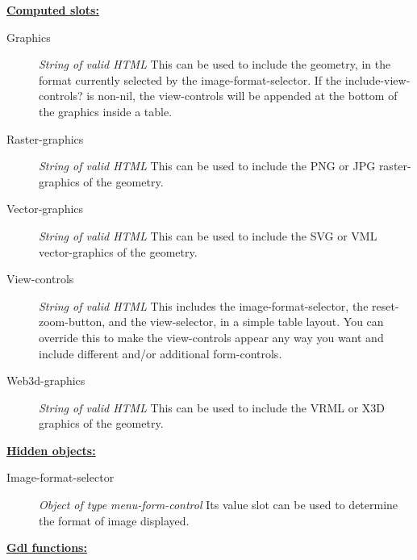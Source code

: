 \documentclass [11pt]{book}
\begin{document}
\begin{itemize}
\textbf{
\underline{Computed slots:}}

\begin{description}

\item [Graphics]
\emph{String of valid HTML} This can be used to
include the geometry, in the format currently selected by the image-format-selector.
If the include-view-controls? is non-nil, the view-controls will be appended at the
bottom of the graphics inside a table.


\item [Raster-graphics]
\emph{String of valid HTML} This can be used to
include the PNG or JPG raster-graphics of the geometry.


\item [Vector-graphics]
\emph{String of valid HTML} This can be used to
include the SVG or VML vector-graphics of the geometry.


\item [View-controls]
\emph{String of valid HTML} This includes the image-format-selector, the reset-zoom-button,
and the view-selector, in a simple table layout. You can override this to make the view-controls
appear any way you want and include different and/or additional form-controls.


\item [Web3d-graphics]
\emph{String of valid HTML} This can be used to
include the VRML or X3D graphics of the geometry.


\end{description}






\textbf{
\underline{Hidden objects:}}

\begin{description}

\item [Image-format-selector]
\emph{Object of type menu-form-control} Its value slot can be used to determine the format of image displayed.


\end{description}






\textbf{
\underline{Gdl functions:}}


\end{itemize}
\end{document}
